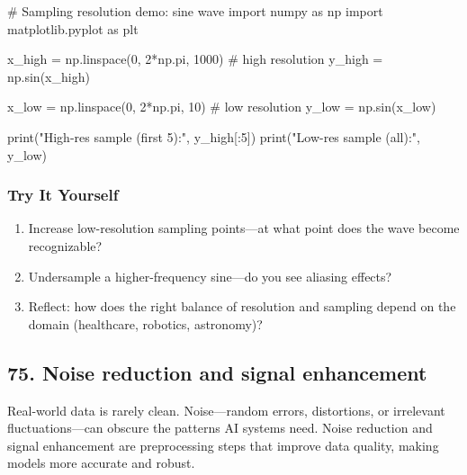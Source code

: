 \documentclass[
  letterpaper,
  DIV=11,
  numbers=noendperiod]{scrreprt}
\newenvironment{Shaded}{\begin{snugshade}}{\end{snugshade}}
\newcommand{\BuiltInTok}[1]{\textcolor[rgb]{0.00,0.23,0.31}{#1}}
\newcommand{\CommentTok}[1]{\textcolor[rgb]{0.37,0.37,0.37}{#1}}
\newcommand{\DecValTok}[1]{\textcolor[rgb]{0.68,0.00,0.00}{#1}}
\newcommand{\ImportTok}[1]{\textcolor[rgb]{0.00,0.46,0.62}{#1}}
\newcommand{\NormalTok}[1]{\textcolor[rgb]{0.00,0.23,0.31}{#1}}
\newcommand{\OperatorTok}[1]{\textcolor[rgb]{0.37,0.37,0.37}{#1}}
\newcommand{\StringTok}[1]{\textcolor[rgb]{0.13,0.47,0.30}{#1}}
\providecommand{\tightlist}{%
  \setlength{\itemsep}{0pt}\setlength{\parskip}{0pt}}
\begin{document}
\begin{Shaded}
\begin{Highlighting}[]
\CommentTok{\# Sampling resolution demo: sine wave}
\ImportTok{import}\NormalTok{ numpy }\ImportTok{as}\NormalTok{ np}
\ImportTok{import}\NormalTok{ matplotlib.pyplot }\ImportTok{as}\NormalTok{ plt}

\NormalTok{x\_high }\OperatorTok{=}\NormalTok{ np.linspace(}\DecValTok{0}\NormalTok{, }\DecValTok{2}\OperatorTok{*}\NormalTok{np.pi, }\DecValTok{1000}\NormalTok{)   }\CommentTok{\# high resolution}
\NormalTok{y\_high }\OperatorTok{=}\NormalTok{ np.sin(x\_high)}

\NormalTok{x\_low }\OperatorTok{=}\NormalTok{ np.linspace(}\DecValTok{0}\NormalTok{, }\DecValTok{2}\OperatorTok{*}\NormalTok{np.pi, }\DecValTok{10}\NormalTok{)      }\CommentTok{\# low resolution}
\NormalTok{y\_low }\OperatorTok{=}\NormalTok{ np.sin(x\_low)}

\BuiltInTok{print}\NormalTok{(}\StringTok{"High{-}res sample (first 5):"}\NormalTok{, y\_high[:}\DecValTok{5}\NormalTok{])}
\BuiltInTok{print}\NormalTok{(}\StringTok{"Low{-}res sample (all):"}\NormalTok{, y\_low)}
\end{Highlighting}
\end{Shaded}

\subsubsection{Try It Yourself}\label{try-it-yourself-73}

\begin{enumerate}
\def\labelenumi{\arabic{enumi}.}
\tightlist
\item
  Increase low-resolution sampling points---at what point does the wave
  become recognizable?
\item
  Undersample a higher-frequency sine---do you see aliasing effects?
\item
  Reflect: how does the right balance of resolution and sampling depend
  on the domain (healthcare, robotics, astronomy)?
\end{enumerate}

\subsection{75. Noise reduction and signal
enhancement}\label{noise-reduction-and-signal-enhancement}

Real-world data is rarely clean. Noise---random errors, distortions, or
irrelevant fluctuations---can obscure the patterns AI systems need.
Noise reduction and signal enhancement are preprocessing steps that
improve data quality, making models more accurate and robust.
\end{document}
